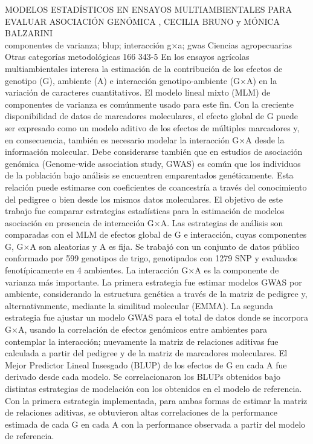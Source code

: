 \A
{MODELOS ESTADÍSTICOS EN ENSAYOS MULTIAMBIENTALES  PARA EVALUAR ASOCIACIÓN GENÓMICA}
{, CECILIA BRUNO y MÓNICA BALZARINI}
{
\\}
{componentes de varianza; blup; interacción g×a; gwas} 
 {Ciencias agropecuarias} 
 {Otras categorías metodológicas} 
 {166} 
 {343-5}
{En los ensayos agrícolas multiambientales interesa la estimación de la contribución de los efectos de genotipo (G), ambiente (A) e interacción genotipo-ambiente (G×A) en la variación de caracteres cuantitativos. El modelo lineal mixto (MLM) de componentes de varianza es comúnmente usado para este fin. Con la creciente disponibilidad de datos de marcadores moleculares, el efecto global de G puede ser expresado como un modelo aditivo de los efectos de múltiples marcadores y, en consecuencia, también es necesario modelar la interacción G×A desde la información molecular. Debe considerarse también que en estudios de asociación genómica (Genome-wide association study, GWAS) es común que los individuos de la población bajo análisis se encuentren emparentados genéticamente. Esta relación puede estimarse con coeficientes de coancestría a través del conocimiento del pedigree o bien desde los mismos datos moleculares. El objetivo de este trabajo fue comparar estrategias estadísticas para la estimación de modelos asociación en presencia de interacción G×A. Las estrategias de análisis son comparadas con el MLM de efectos global de G e interacción, cuyas componentes G, G×A son aleatorias y A es fija. Se trabajó con un conjunto de datos público conformado por 599 genotipos de trigo, genotipados con 1279 SNP y evaluados fenotípicamente en 4 ambientes. La interacción G×A es la componente de varianza más importante. La primera estrategia fue estimar modelos GWAS por ambiente, considerando la estructura genética a través de la matriz de pedigree y, alternativamente, mediante la similitud molecular (EMMA). La segunda estrategia fue ajustar un modelo GWAS para el total de datos donde se incorpora G×A, usando la correlación de efectos genómicos entre ambientes para contemplar la interacción; nuevamente la matriz de relaciones aditivas fue calculada a partir del pedigree y de la matriz de marcadores moleculares. El Mejor Predictor Lineal Insesgado (BLUP) de los efectos de G en cada A fue derivado desde cada modelo. Se correlacionaron los BLUPs obtenidos bajo distintas estrategias de modelación con los obtenidos en el modelo de referencia. Con la primera estrategia implementada, para ambas formas de estimar la matriz de relaciones aditivas, se obtuvieron altas correlaciones de la performance estimada de cada G en cada A con la performance observada a partir del modelo de referencia.}
